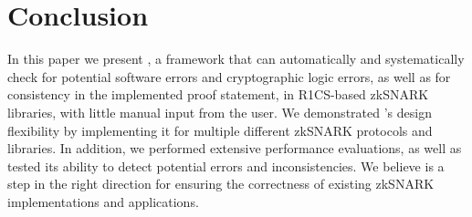 \section{Conclusion}
\label{sec:snarkprobe-conclusion}

In this paper we present \snarkprobe, a framework that can automatically and systematically check for potential software errors and cryptographic logic errors, as well as for consistency in the implemented proof statement, in R1CS-based zkSNARK libraries, with little manual input from the user.  We demonstrated \snarkprobe's design flexibility by implementing it for multiple different zkSNARK protocols and libraries.  In addition, we performed extensive performance evaluations, as well as tested its ability to detect potential errors and inconsistencies.  We believe \snarkprobe is a step in the right direction for ensuring the correctness of existing zkSNARK implementations and applications.
